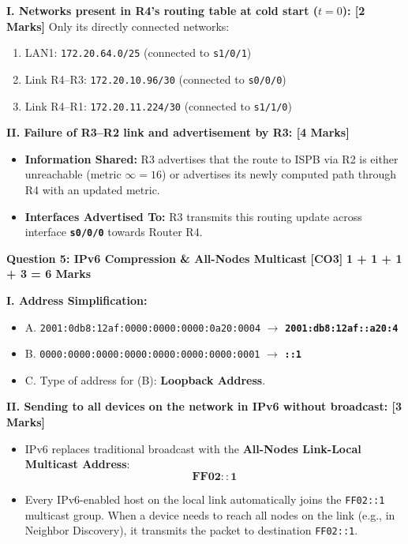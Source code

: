 \documentclass[11pt,a4paper]{article}
\newcommand{\questionheader}[3]{
    \vspace{0.35cm}
    \noindent\colorbox{qboxbg}{
        \parbox{\dimexpr\textwidth-2\fboxsep\relax}{
            \textbf{\textcolor{primary}{\large #1}} \hfill \textbf{\textcolor{accent}{[#2]}} \hfill \textbf{\textcolor{secondary}{#3 Marks}}
        }
    }
    \vspace{0.15cm}
}
\begin{document}
\textbf{I. Networks present in R4's routing table at cold start ($t=0$): [2 Marks]}
Only its directly connected networks:
\begin{enumerate}
    \item LAN1: \texttt{172.20.64.0/25} (connected to \texttt{s1/0/1})
    \item Link R4--R3: \texttt{172.20.10.96/30} (connected to \texttt{s0/0/0})
    \item Link R4--R1: \texttt{172.20.11.224/30} (connected to \texttt{s1/1/0})
\end{enumerate}

\textbf{II. Failure of R3--R2 link and advertisement by R3: [4 Marks]}
\begin{itemize}
    \item \textbf{Information Shared:} R3 advertises that the route to ISPB via R2 is either unreachable (metric $\infty = 16$) or advertises its newly computed path through R4 with an updated metric.
    \item \textbf{Interfaces Advertised To:} R3 transmits this routing update across interface \textbf{\texttt{s0/0/0}} towards Router R4.
\end{itemize}

\questionheader{Question 5: IPv6 Compression \& All-Nodes Multicast}{CO3}{1 + 1 + 1 + 3 = 6}

\textbf{I. Address Simplification:}
\begin{itemize}
    \item A. \texttt{2001:0db8:12af:0000:0000:0000:0a20:0004} $\to$ \textbf{\texttt{2001:db8:12af::a20:4}}
    \item B. \texttt{0000:0000:0000:0000:0000:0000:0000:0001} $\to$ \textbf{\texttt{::1}}
    \item C. Type of address for (B): \textbf{Loopback Address}.
\end{itemize}

\textbf{II. Sending to all devices on the network in IPv6 without broadcast: [3 Marks]}
\begin{itemize}
    \item IPv6 replaces traditional broadcast with the \textbf{All-Nodes Link-Local Multicast Address}:
    \[
    \mathbf{FF02::1}
    \]
    \item Every IPv6-enabled host on the local link automatically joins the \texttt{FF02::1} multicast group. When a device needs to reach all nodes on the link (e.g., in Neighbor Discovery), it transmits the packet to destination \texttt{FF02::1}.
\end{itemize}
\end{document}
